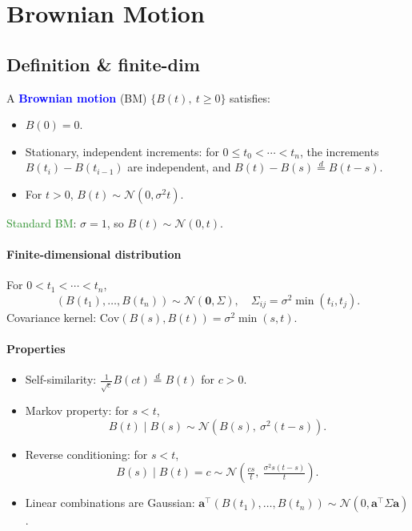 \section{Brownian Motion}
\subsection{Definition \& finite-dim}
A \textcolor{Blue}{\textbf{Brownian motion}} (BM) $\{B(t),\ t\ge 0\}$ satisfies:
\begin{itemize}
  \item $B(0)=0$.
  \item \textcolor{Bittersweet}{Stationary, independent increments}: for
    $0\le t_0<\cdots<t_n$, the increments $B(t_i)-B(t_{i-1})$ are independent,
    and $B(t)-B(s)\stackrel{d}{=}B(t-s)$.
  \item For $t>0$, $B(t)\sim\mathcal{N}(0,\sigma^2 t)$.
\end{itemize}
\textcolor{ForestGreen}{Standard BM}: $\sigma=1$, so $B(t)\sim\mathcal{N}(0,t)$.

\paragraph{Finite-dimensional distribution}
For $0<t_1<\cdots<t_n$,
\[(B(t_1),\ldots,B(t_n))\sim\mathcal{N}(\mathbf 0,\Sigma),
\quad \Sigma_{ij}=\sigma^2\min(t_i,t_j).\]
\textcolor{Bittersweet}{Covariance kernel}:
$\mathrm{Cov}(B(s),B(t))=\sigma^2\min(s,t)$.

\paragraph{Properties}
\begin{itemize}
  \item \textcolor{Bittersweet}{Self-similarity}: $\frac{1}{\sqrt c}B(ct)
    \stackrel{d}{=}B(t)$ for $c>0$.
  \item \textcolor{Bittersweet}{Markov property}: for $s<t$,
    \[B(t)\mid B(s)\sim\mathcal{N}(B(s),\ \sigma^2(t-s)).\]
  \item \textcolor{Bittersweet}{Reverse conditioning}: for $s<t$,
    \[B(s)\mid B(t)=c\sim\mathcal{N}\!\left(\tfrac{cs}{t},\ \tfrac{\sigma^2 s(t-s)}{t}\right).\]
  \item Linear combinations are Gaussian:
    $\mathbf a^\top(B(t_1),\ldots,B(t_n))\sim\mathcal{N}(0,\mathbf a^\top\Sigma\mathbf a)$.
\end{itemize}

